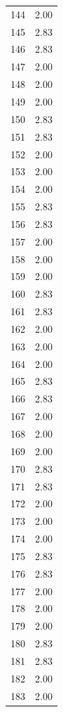 \documentclass[a4paper,11pt]{article}
\begin{document}
\begin{center}
\begin{longtable}{|R{1.5cm}|R{2.5cm}|}
  144  &         2.00 \\ 
  145  &         2.83 \\ 
  146  &         2.83 \\ 
  147  &         2.00 \\ 
  148  &         2.00 \\ 
  149  &         2.00 \\ 
  150  &         2.83 \\ 
  151  &         2.83 \\ 
  152  &         2.00 \\ 
  153  &         2.00 \\ 
  154  &         2.00 \\ 
  155  &         2.83 \\ 
  156  &         2.83 \\ 
  157  &         2.00 \\ 
  158  &         2.00 \\ 
  159  &         2.00 \\ 
  160  &         2.83 \\ 
  161  &         2.83 \\ 
  162  &         2.00 \\ 
  163  &         2.00 \\ 
  164  &         2.00 \\ 
  165  &         2.83 \\ 
  166  &         2.83 \\ 
  167  &         2.00 \\ 
  168  &         2.00 \\ 
  169  &         2.00 \\ 
  170  &         2.83 \\ 
  171  &         2.83 \\ 
  172  &         2.00 \\ 
  173  &         2.00 \\ 
  174  &         2.00 \\ 
  175  &         2.83 \\ 
  176  &         2.83 \\ 
  177  &         2.00 \\ 
  178  &         2.00 \\ 
  179  &         2.00 \\ 
  180  &         2.83 \\ 
  181  &         2.83 \\ 
  182  &         2.00 \\ 
  183  &         2.00 \\ 

\end{longtable}
\end{center}
\end{document}
